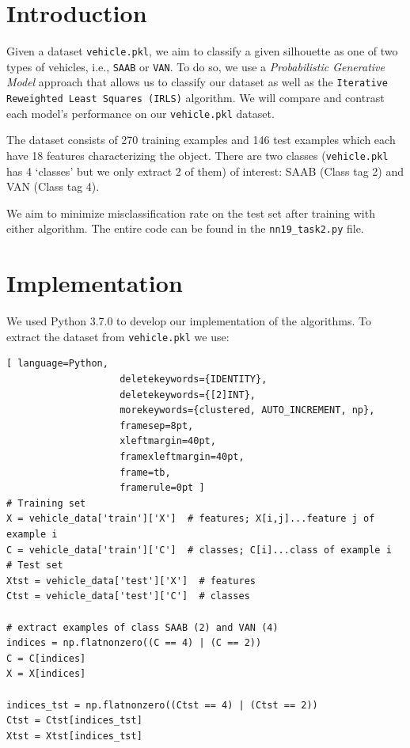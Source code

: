 \documentclass[a4paper,11pt,oneside]{article}
\begin{document}
  \newpage
  \tableofcontents

  \clearpage

\section{Introduction}
  Given a dataset \texttt{vehicle.pkl}, we aim to classify a given silhouette as one of two types of vehicles, i.e., \texttt{SAAB} or \texttt{VAN}. To do so, we use a \textit{Probabilistic Generative Model} approach that allows us to classify our dataset as well as the \texttt{Iterative Reweighted Least Squares (IRLS)} algorithm. We will compare and contrast each model's performance on our \texttt{vehicle.pkl} dataset.

The dataset consists of 270 training examples and 146 test examples which each have 18 features characterizing the object. There are two classes (\texttt{vehicle.pkl} has 4 `classes' but we only extract 2 of them) of interest: SAAB (Class tag 2) and VAN (Class tag 4).

We aim to minimize misclassification rate on the test set after training with either algorithm. The entire code can be found in the \texttt{nn19\_task2.py} file.

\newpage

\section{Implementation}

We used Python 3.7.0 to develop our implementation of the algorithms. To extract the dataset from \texttt{vehicle.pkl} we use:
\begin{lstlisting}[ language=Python,
                    deletekeywords={IDENTITY},
                    deletekeywords={[2]INT},
                    morekeywords={clustered, AUTO_INCREMENT, np},
                    framesep=8pt,
                    xleftmargin=40pt,
                    framexleftmargin=40pt,
                    frame=tb,
                    framerule=0pt ]
# Training set
X = vehicle_data['train']['X']  # features; X[i,j]...feature j of example i
C = vehicle_data['train']['C']  # classes; C[i]...class of example i
# Test set
Xtst = vehicle_data['test']['X']  # features
Ctst = vehicle_data['test']['C']  # classes

# extract examples of class SAAB (2) and VAN (4)
indices = np.flatnonzero((C == 4) | (C == 2))
C = C[indices]
X = X[indices]

indices_tst = np.flatnonzero((Ctst == 4) | (Ctst == 2))
Ctst = Ctst[indices_tst]
Xtst = Xtst[indices_tst]
\end{lstlisting}
\end{document}
